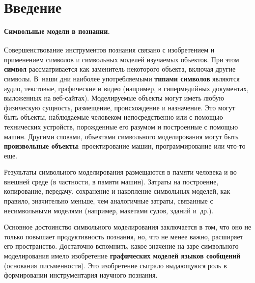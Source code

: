 \begin{multicols}{2}


\label{st\stat} 

\thispagestyle{headings}

\section{Введение}

\paragraph*{Символьные модели в познании.}Совершенствование инструментов
познания связано с изобретением и применением символов и символьных моделей
изучаемых объектов. При этом \textbf{символ} рассматривается как заменитель 
некоторого объекта, включая другие символы. В~наши дни наиболее употребляемыми 
\textbf{типами символов} являются аудио, текстовые, графические и видео 
(например, в гипермедийных документах, выложенных на веб-сайтах). Моделируемые 
объекты могут иметь любую физическую сущность, размещение, происхождение и 
назначение. Это могут быть объекты, наблюдаемые человеком непосредственно или с 
помощью технических устройств, порожденные его разумом и построенные с помощью 
машин. Другими словами, объектами символьного моделирования могут быть 
\textbf{произвольные объекты}: проектирование машин, программирование или 
что-то еще.

Результаты символьного моделирования размещаются в памяти человека и
во внешней среде (в частности, в памяти машин). Затраты на построение,
копирование, передачу, сохранение и накопление символьных моделей, как
правило, значительно меньше, чем аналогичные затраты, связанные с
несимвольными моделями (например, макетами судов, зданий и~др.).

Основное достоинство символьного моделирования заключается в том, что оно не 
только повышает продуктивность познания, но, что не менее важно, расширяет его 
пространство. Достаточно вспомнить, какое значение на заре символьного 
моделирования имело изобретение \textbf{графических моделей языков сообщений} 
(основания письменности). Это изобретение сыграло выдающуюся роль в 
формировании инструментария научного познания. 
{

}


\end{multicols}
